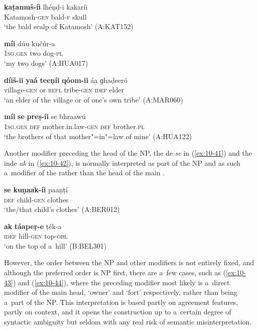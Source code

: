 \begin{exe}
\ex
\label{ex:10-37}
\gll \textbf{kaṭamuš-íi} lhéṇḍ-i kakaríi \\
Katamosh-\textsc{gen} bald-\textsc{f} skull \\
\glt `the bald scalp of Katamosh' (A:KAT152)

\ex
\label{ex:10-38}
\gll \textbf{míi} dúu kučúr-a \\
\textsc{1sg.gen} two dog-\textsc{pl}  \\
\glt `my two dogs' (A:HUA017)

\ex
\label{ex:10-39}
\gll \textbf{díiš-ii} \textbf{yaá} \textbf{teeṇíi} \textbf{qóom-ii} áa ɡhaḍeeró  \\
village-\textsc{gen} or \textsc{refl} tribe-\textsc{gen} \textsc{idef} elder \\
\glt `an elder of the village or of one's own tribe' (A:MAR060)

\ex
\label{ex:10-40}
\gll \textbf{míi} \textbf{se} \textbf{preṣ-íi} se bhraawú \\
\textsc{1sg.gen} \textsc{def} mother.in.law-\textsc{gen} \textsc{def} brother.\textsc{pl}  \\
\glt `the brothers of that mother"=in"=law of mine' (A:HUA122)
\end{exe}


Another modifier preceding the head of the  NP, the de \textit{se} in (\ref{ex:10-41}) and the inde \textit{ak} in (\ref{ex:10-42}), is normally interpreted as part of the  NP and as such a~modifier of the   rather than the head of the main  .

\begin{exe}
\ex
\label{ex:10-41}
\gll \textbf{se} \textbf{kuṇaak-íi} paaṇṭí \\
\textsc{def} child-\textsc{gen} clothes  \\
\glt `the/that child's clothes' (A:BER012)

\ex
\label{ex:10-42}
\gll \textbf{ak} \textbf{táapeṛ-e} ṭék-a \\
\textsc{idef} hill-\textsc{gen} top-\textsc{obl}  \\
\glt `on the top of a~hill' (B:BEL301)
\end{exe}


However, the order between the  NP and other modifiers is not entirely fixed, and although the preferred order is  NP first, there are a~few cases, such as (\ref{ex:10-43}) and (\ref{ex:10-44}), where the preceding modifier most likely is a~direct modifier of the main  head, `owner' and `fort' respectively, rather than being a~part of the  NP. This interpretation is based partly on agreement features, partly on context, and it opens the construction up to a~certain degree of syntactic ambiguity but seldom with any real risk of semantic misinterpretation.


